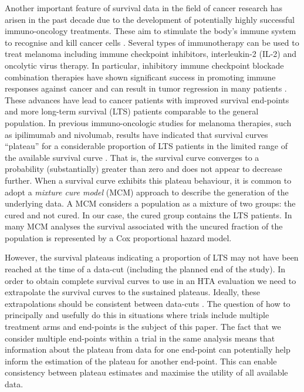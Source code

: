 \documentclass[AMA,STIX1COL]{WileyNJD-v2}
\begin{document}
Another important feature of survival data in the field of cancer research has arisen in the past decade due to the development of potentially highly successful immuno-oncology treatments.
These aim to stimulate the body’s immune system to recognise and kill cancer cells \cite{Ouwens2019}. Several types of immunotherapy can be used to treat melanoma including immune checkpoint inhibitors, interleukin-2 (IL-2) and oncolytic virus therapy.
In particular, inhibitory immune checkpoint blockade combination therapies have shown significant success in promoting immune responses against cancer and can result in tumor regression in many patients \cite{Khair2019}.
These advances have lead to cancer patients with improved survival end-points and more long-term survival (LTS) patients comparable to the general population.
In previous immuno-oncologic studies for melanoma therapies, such as ipilimumab and nivolumab,
results have indicated that survival curves ``plateau'' for a considerable proportion of LTS patients in the limited range of the available survival curve \citep{Wolchok2017, Larkin2019}.
That is, the survival curve converges to a probability (substantially) greater than zero and does not appear to decrease further.
When a survival curve exhibits this plateau behaviour, it is common to adopt a \textit{mixture cure model} (MCM) approach to describe the generation of the underlying data.
A MCM considers a population as a mixture of two groups: the cured and not cured.
In our case, the cured group contains the LTS patients.
In many MCM analyses the survival associated with the uncured fraction of the population is represented by a Cox proportional hazard model.

However, the survival plateaus indicating a proportion of LTS may not have been reached at the time of a data-cut (including the planned end of the study).
In order to obtain complete survival curves to use in an HTA evaluation we need to extrapolate the survival curves to the sustained plateaus.
Ideally, these extrapolations should be consistent between data-cuts \citep{Bullement2020}.
The question of how to principally and usefully do this in situations where trials include multiple treatment arms and end-points is the subject of this paper.
The fact that we consider multiple end-points within a trial in the same analysis means that information about the plateau from data for one end-point can potentially help inform the estimation of the plateau for another end-point.
This can enable consistency between plateau estimates and maximise the utility of all available data.
\end{document}
